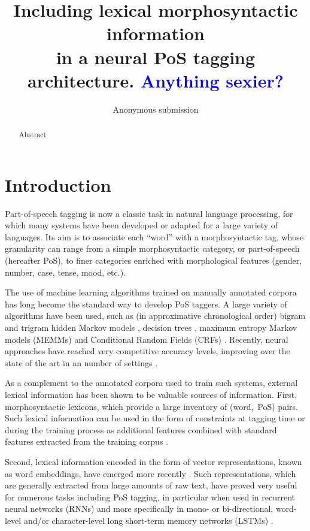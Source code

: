 \documentclass[11pt,letterpaper]{article}
\title{Including lexical morphosyntactic information\\in a neural PoS tagging architecture. \textcolor{blue}{Anything sexier?}}
\author{Anonymous submission}
\date{}
\begin{document}
\maketitle

\begin{abstract}
  Abstract
\end{abstract}


\section{Introduction}

Part-of-speech tagging is now a classic task in natural language processing, for which many systems have been developed
or adapted for a large variety of languages. Its aim is to associate each ``word'' with a morphosyntactic tag, whose
granularity can range from a simple morphosyntactic category, or part-of-speech (hereafter PoS), to finer categories
enriched with morphological features (gender, number, case, tense, mood, etc.).

The use of machine learning algorithms trained on manually annotated corpora has long become the standard way to develop
PoS taggers. A large variety of algorithms have been used, such as (in approximative chronological order) bigram and
trigram hidden Markov models \cite{merialdo94,brants96,brants00}, decision trees \cite{schmid94,magerman95}, maximum
entropy Markov models (MEMMs) \cite{ratnaparkhi96} and Conditional Random Fields (CRFs)
\cite{lafferty01,constant12}. Recently, neural approaches have reached very competitive accuracy levels, improving over
the state of the art in an number of settings \cite{plank16}.

As a complement to the annotated corpora used to train such systems, external lexical information has been shown to be
valuable sources of information. First, morphosyntactic lexicons, which provide a large inventory of (word,~PoS)
pairs. Such lexical information can be used in the form of constraints at tagging time \cite{kim99,hajic00tagging} or
during the training process as additional features combined with standard features extracted from the training corpus
\cite{chrupala08,goldberg09,denis12}.

Second, lexical information encoded in the form of vector representations, known as word embeddings, have
emerged more recently \cite{bengio03,collobert08,chrupala13,ling15,ballesteros15,muller15}. Such representations, which
are generally extracted from large amounts of raw text, have proved very useful for numerous tasks including PoS
tagging, in particular when used in recurrent neural networks (RNNs) and more specifically in mono- or bi-directional,
word-level and/or character-level long short-term memory networks (LSTMs)
\cite{hochreiter97,ling15,ballesteros15,plank16}.
\end{document}
